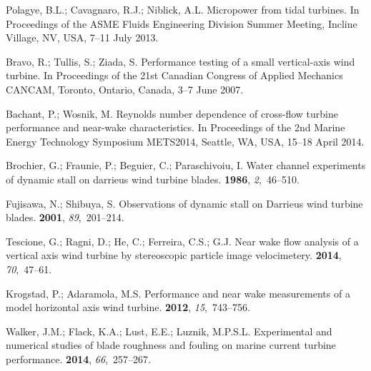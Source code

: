 \documentclass[energies,article,accept,moreauthors,pdftex,10pt,a4paper]{mdpi}
\theoremstyle{mdpi}
\newcounter{ex}
\newcounter{re}
\begin{document}
\begin{thebibliography}{999}
Polagye, B.L.; Cavagnaro, R.J.; Niblick, A.L. \newblock Micropower from tidal
turbines. \newblock In Proceedings of the ASME Fluids Engineering Division
Summer Meeting, Incline Village, NV, USA, 7--11 July 2013.

 Bravo, R.;
Tullis, S.; Ziada, S. \newblock Performance testing of a small vertical-axis
wind turbine. \newblock In Proceedings of the 21st Canadian Congress of Applied
Mechanics CANCAM, Toronto, Ontario, Canada, 3--7 June 2007.

 Bachant, P.; Wosnik, M.
\newblock Reynolds number dependence of cross-flow turbine performance and
near-wake characteristics. \newblock In Proceedings of the 2nd Marine Energy
Technology Symposium METS2014, Seattle, WA, USA, 15--18 April 2014.

 Brochier, G.; Fraunie, P.; Beguier, C.;
Paraschivoiu, I. \newblock Water channel experiments of dynamic stall on
darrieus wind turbine blades.  {\bf 1986},
{\em 2},~46--510.

 Fujisawa, N.; Shibuya, S.
\newblock Observations of dynamic stall on Darrieus wind turbine blades.
 {\bf 2001}, {\em 89},~201--214.

 Tescione, G.; Ragni, D.; He, C.; Ferreira, C.S.; G.J.
\newblock Near wake flow analysis of a vertical axis wind turbine by
stereoscopic particle image velocimetery.  {\bf
    2014}, {\em 70},~47--61.

 Krogstad, P.; Adaramola,
M.S. \newblock Performance and near wake measurements of a model horizontal axis
wind turbine.  {\bf 2012}, {\em 15},~743--756.

Walker, J.M.; Flack, K.A.; Lust, E.E.; Luznik, M.P.S.L. \newblock Experimental
and numerical studies of blade roughness and fouling on marine current turbine
performance.  {\bf 2014}, {\em 66},~257--267.


\end{thebibliography}
\end{document}
